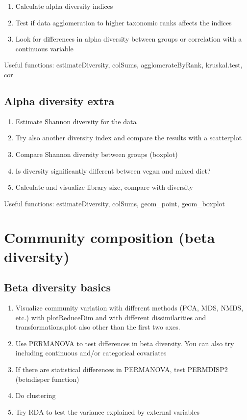 \documentclass[
]{book}
\providecommand{\tightlist}{%
  \setlength{\itemsep}{0pt}\setlength{\parskip}{0pt}}
\begin{document}
\begin{enumerate}
\def\labelenumi{\arabic{enumi}.}
\tightlist
\item
  Calculate alpha diversity indices
\item
  Test if data agglomeration to higher taxonomic ranks affects the indices
\item
  Look for differences in alpha diversity between groups or correlation with a continuous variable
\end{enumerate}

Useful functions: estimateDiversity, colSums, agglomerateByRank, kruskal.test, cor

\hypertarget{alpha-diversity-extra}{%
\subsection{Alpha diversity extra}\label{alpha-diversity-extra}}

\begin{enumerate}
\def\labelenumi{\arabic{enumi}.}
\tightlist
\item
  Estimate Shannon diversity for the data
\item
  Try also another diversity index and compare the results with a scatterplot
\item
  Compare Shannon diversity between groups (boxplot)
\item
  Is diversity significantly different between vegan and mixed diet?
\item
  Calculate and visualize library size, compare with diversity
\end{enumerate}

Useful functions: estimateDiversity, colSums, geom\_point, geom\_boxplot

\hypertarget{community-composition-beta-diversity}{%
\section{Community composition (beta diversity)}\label{community-composition-beta-diversity}}

\hypertarget{beta-diversity-basics}{%
\subsection{Beta diversity basics}\label{beta-diversity-basics}}

\begin{enumerate}
\def\labelenumi{\arabic{enumi}.}
\tightlist
\item
  Visualize community variation with different methods (PCA, MDS, NMDS, etc.) with plotReduceDim and with different dissimilarities and transformations,plot also other than the first two axes.
\item
  Use PERMANOVA to test differences in beta diversity. You can also try including continuous and/or categorical covariates
\item
  If there are statistical differences in PERMANOVA, test PERMDISP2 (betadisper function)
\item
  Do clustering
\item
  Try RDA to test the variance explained by external variables
\end{enumerate}
\end{document}

